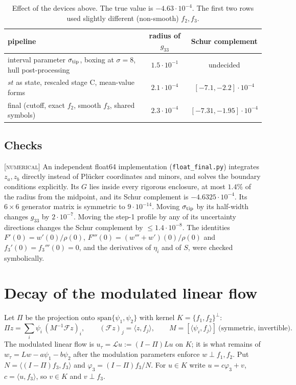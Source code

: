 \documentclass[11pt]{amsart}
\theoremstyle{definition}
\theoremstyle{remark}
\newcommand{\ip}[2]{\langle #1,#2\rangle}
\newcommand{\lab}[1]{\textup{\textsc{[#1]}}}
\newcommand{\stip}{\sigma_{\rm tip}}
\begin{document}
\begin{table}[h]
\centering\small
\begin{tabular}{@{}lcc@{}}
\toprule
pipeline & radius of $g_{33}$ & Schur complement\\
\midrule
interval parameter $\stip$, boxing at $\sigma=8$, hull post-processing & $1.5\cdot10^{-1}$ & undecided\\
$st$ as state, rescaled stage C, mean-value forms & $2.1\cdot10^{-4}$ & $[-7.1,-2.2]\cdot10^{-4}$\\
final (cutoff, exact $f_2$, smooth $f_3$, shared symbols) & $2.3\cdot10^{-4}$ & $[-7.31,-1.95]\cdot10^{-4}$\\
\bottomrule
\end{tabular}
\caption{Effect of the devices above. The true value is $-4.63\cdot10^{-4}$. The first two rows used slightly different (non-smooth) $f_2,f_3$.}
\end{table}

\subsection*{Checks}
\lab{numerical} An independent float64 implementation (\texttt{float\_final.py}) integrates $z_a,z_b$ directly instead of Pl\"ucker coordinates and minors, and solves the boundary conditions explicitly. Its $G$ lies inside every rigorous enclosure, at most $1.4\%$ of the radius from the midpoint, and its Schur complement is $-4.6325\cdot10^{-4}$. Its $6\times6$ generator matrix is symmetric to $9\cdot10^{-14}$. Moving $\stip$ by its half-width changes $g_{33}$ by $2\cdot10^{-7}$. Moving the step-1 profile by any of its uncertainty directions changes the Schur complement by $\le1.4\cdot10^{-8}$. The identities $F'(0)=w'(0)/\rho(0)$, $F'''(0)=(w'''+w')(0)/\rho(0)$ and $f_3'(0)=f_3'''(0)=0$, and the derivatives of $\eta_i$ and of $S$, were checked symbolically.

\section{Decay of the modulated linear flow}\label{sec:decay}

Let $\Pi$ be the projection onto $\mathrm{span}\{\psi_1,\psi_2\}$ with kernel $K=\{f_1,f_2\}^\perp$:
\[
\Pi z=\sum_{i}\psi_i\,(M^{-1}\mathcal Fz)_i,\qquad (\mathcal Fz)_j=\ip{z}{f_j},\qquad M=[\ip{\psi_i}{f_j}]\ \text{(symmetric, invertible)}.
\] The modulated linear flow is $u_\tau=\mathcal Lu:=(I-\Pi)Lu$ on $K$; it is what remains of $w_\tau=Lw-a\psi_1-b\psi_2$ after the modulation parameters enforce $w\perp f_1,f_2$. Put $N=\ip{(I-\Pi)f_3}{f_3}$ and $\varphi_3=(I-\Pi)f_3/N$. For $u\in K$ write $u=c\varphi_3+v$, $c=\ip{u}{f_3}$, so $v\in K$ and $v\perp f_3$.
\end{document}
